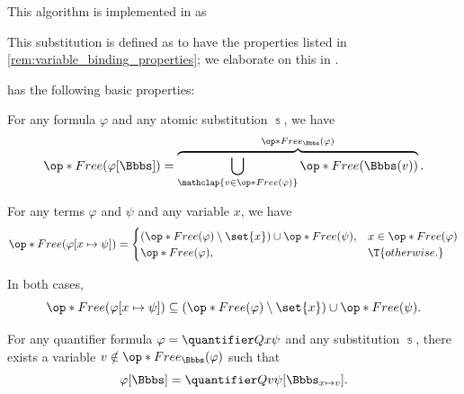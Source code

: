 \begin{comments}
  \item This algorithm is implemented in \cite{notebook:code} as
  \begin{CodeRefDisplay}
  \end{CodeRefDisplay}

  \item This substitution is defined as to have the properties listed in \cref{rem:variable_binding_properties}; we elaborate on this in .
\end{comments}

\begin{proposition}\label{thm:alg:fol_formula_substitution}
   has the following basic properties:
  \begin{thmenum}
     For any formula \( \varphi \) and any atomic substitution \( \Bbbs \), we have
    \begin{equation}\label{eq:thm:alg:fol_formula_substitution/free}
      \op*{Free}( \varphi[\Bbbs] ) = \overbrace{\bigcup_{\mathclap{v \in \op*{Free}(\varphi)}} \op*{Free}(\Bbbs(v))}^{\op*{Free}_\Bbbs(\varphi)}.
    \end{equation}

     For any terms \( \varphi \) and \( \psi \) and any variable \( x \), we have
    \begin{equation}\label{eq:thm:alg:fol_formula_substitution/free_single}
      \op*{Free}( \varphi[x \mapsto \psi] ) = \begin{cases}
        (\op*{Free}(\varphi) \setminus \set{ x }) \cup \op*{Free}(\psi), &x \in \op*{Free}(\varphi) \\
        \op*{Free}(\varphi),                                             &\T{otherwise.}
      \end{cases}
    \end{equation}

    In both cases,
    \begin{equation}\label{eq:thm:alg:fol_formula_substitution/free_single/subset}
      \op*{Free}( \varphi[x \mapsto \psi] ) \subseteq (\op*{Free}(\varphi) \setminus \set{ x }) \cup \op*{Free}(\psi).
    \end{equation}

     For any quantifier formula \( \varphi = \quantifier Q x \psi \) and any substitution \( \Bbbs \), there exists a variable \( v \notin \op*{Free}_\Bbbs(\varphi) \) such that
    \begin{equation}\label{eq:thm:alg:fol_formula_substitution/quant_single_rule}
      \varphi[\Bbbs] = \quantifier Q v \psi[\Bbbs_{x \mapsto v}].
    \end{equation}


\end{thmenum}
\end{proposition}
